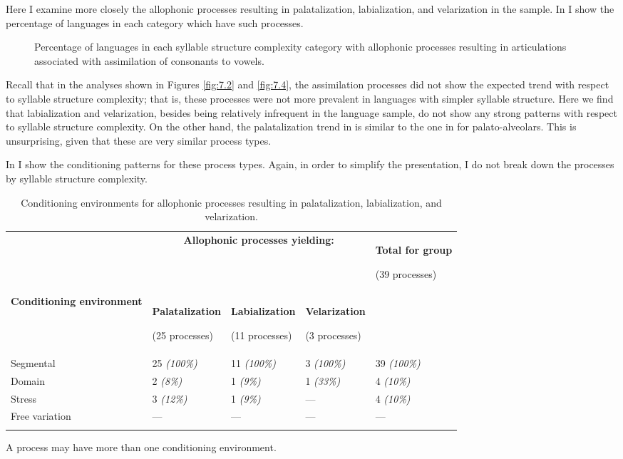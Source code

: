   Here I examine more closely the allophonic processes resulting in palatalization, labialization, and velarization in the sample. In  I show the percentage of languages in each category which have such processes.

\begin{figure}
\caption{\label{fig:7.7} Percentage of languages in each syllable structure complexity category with allophonic processes resulting in articulations associated with assimilation of consonants to vowels.}
\end{figure}
  Recall that in the analyses shown in Figures \ref{fig:7.2} and \ref{fig:7.4}, the assimilation processes did not show the expected trend with respect to syllable structure complexity; that is, these processes were not more prevalent in languages with simpler syllable structure. Here we find that labialization and velarization, besides being relatively infrequent in the language sample, do not show any strong patterns with respect to syllable structure complexity. On the other hand, the palatalization trend in  is similar to the one in  for palato-alveolars. This is unsurprising, given that these are very similar process types.

  In  I show the conditioning patterns for these process types. Again, in order to simplify the presentation, I do not break down the processes by syllable structure complexity.

\begin{table}
\begin{tabularx}{\textwidth}{XXXXX}
\lsptoprule
 & \multicolumn{3}{c}{ \textbf{Allophonic processes yielding:}} & { \textbf{Total for group}}

 (39 processes)\\
 \textbf{Conditioning environment} & { \textbf{Palatalization}}

 (25 processes) & { \textbf{Labialization}}

 (11 processes) & { \textbf{Velarization}}

 (3 processes) & \\
 Segmental & 25 \textit{(100\%)} & 11 \textit{(100\%)} & 3 \textit{(100\%)} & 39 \textit{(100\%)}\\
 Domain & 2 \textit{(8\%)} & 1 \textit{(9\%)} & 1 \textit{(33\%)} & 4 \textit{(10\%)}\\
 Stress & 3 \textit{(12\%)} & 1 \textit{(9\%)} & — & 4 \textit{(10\%)}\\
 Free variation & — & — & — & —\\
\lspbottomrule
\end{tabularx}
\caption{\label{tab:7.3}Conditioning environments for allophonic processes resulting in palatalization, labialization, and velarization.}A process may have more than one conditioning environment.
\end{table}

